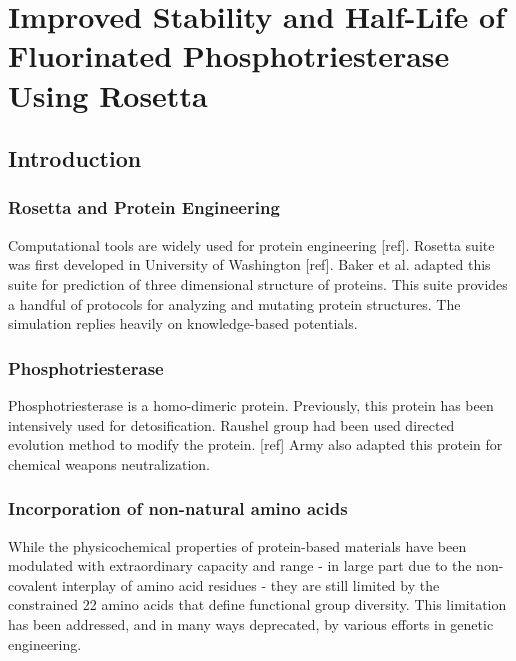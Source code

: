 \chapter{Improved Stability and Half-Life of Fluorinated Phosphotriesterase Using Rosetta}
\label{chap:rosetta}
\begin{refsection}

\section{Introduction}

\subsection{Rosetta and Protein Engineering}

\label{sec:rosetta}

Computational tools are widely used for protein engineering [ref]. Rosetta
suite was first developed in University of Washington [ref]. Baker et al.
adapted this suite for prediction of three dimensional structure of proteins.
This suite provides a handful of protocols for analyzing and mutating protein
structures. The simulation replies heavily on knowledge-based potentials.

\subsection{Phosphotriesterase}
\label{sec:pte}

Phosphotriesterase is a homo-dimeric protein. Previously, this protein has been
intensively used for detosification. Raushel group had been used directed
evolution method to modify the protein. [ref] Army also adapted this protein
for chemical weapons neutralization. \cite{Yang2014a}

\subsection{Incorporation of non-natural amino acids}
\label{sec:rsi}

While the physicochemical properties of protein-based materials have been
modulated with extraordinary capacity and range - in large part due to
the non-covalent interplay of amino acid residues - they are still limited by
the constrained 22 amino acids that define functional group diversity.
This limitation has been addressed, and in many ways deprecated, by various
efforts in genetic engineering.


\end{refsection}
